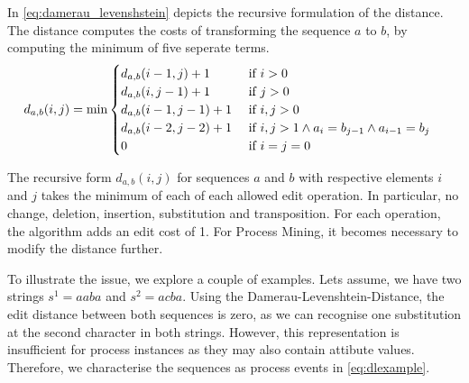 \documentclass[./../../paper.tex]{subfiles}
\begin{document}
\noindent In \autoref{eq:damerau_levenshstein} depicts the recursive formulation of the distance. The distance computes the costs of transforming the sequence $a$ to $b$, by computing the minimum of five seperate terms.  
\begin{align}
    \label{eq:damerau_levenshstein}
    d_{a, b}(i, j) & =\min
    \begin{cases}
        d_{a, b}(i-1, j  )+ 1 & \text { if } i>0                                            \\
        d_{a, b}(i  , j-1)+ 1 & \text { if } j>0                                            \\
        d_{a, b}(i-1, j-1)+ 1 & \text { if } i, j>0                                         \\
        d_{a, b}(i-2, j-2)+ 1 & \text { if } i, j>1 \land a_{i}=b_{j-1} \land a_{i-1}=b_{j} \\
        0                                 & \text { if } i=j=0                                         
    \end{cases}        
\end{align}

\noindent The recursive form $d_{a, b}(i, j)$ for sequences $a$ and $b$ with respective elements $i$ and $j$ takes the minimum of each of each allowed edit operation. In particular, no change, deletion, insertion, substitution and transposition. For each operation, the algorithm adds an edit cost of 1. For Process Mining, it becomes necessary to modify the distance further. 

To illustrate the issue, we explore a couple of examples. Lets assume, we have two strings $s^1=aaba$ and $s^2=acba$. Using the Damerau-Levenshtein-Distance, the edit distance between both sequences is zero, as we can recognise one substitution at the second character in both strings. However, this representation is insufficient for process instances as they may also contain attibute values. Therefore, we characterise the sequences as process events in \autoref{eq:dlexample}. 
\end{document}
